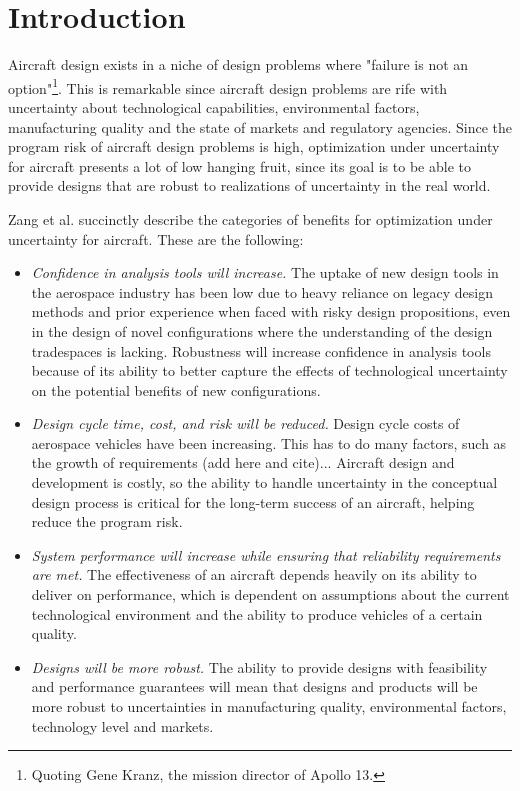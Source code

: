 \section{Introduction}

Aircraft design exists in a niche of design problems where "failure is
not an option"\footnote{Quoting Gene Kranz, the mission director of Apollo 13.}.
This is remarkable since aircraft design problems are rife with uncertainty about
technological capabilities, environmental factors, manufacturing quality and the
state of markets and regulatory agencies. Since the program risk of aircraft design
problems is high, optimization under uncertainty for aircraft presents a lot of
low hanging fruit, since its goal is to be able to provide designs that are robust
to realizations of uncertainty in the real world.

Zang et al.\cite{Zang2002} succinctly describe the categories of benefits for optimization under uncertainty for aircraft.
These are the following:
\begin{itemize}
    \item \textit{Confidence in analysis tools will increase.}
    The uptake of new design tools in the aerospace industry has been low
    due to heavy reliance on legacy design methods and prior experience when
    faced with risky design propositions,
    even in the design of novel configurations where the understanding
    of the design tradespaces is lacking. Robustness will increase
    confidence in analysis tools because of its ability to better capture the
    effects of technological uncertainty on the potential benefits of new
    configurations.
    \item \textit{Design cycle time, cost, and risk will be reduced.}
    Design cycle costs of aerospace vehicles have been increasing. This has to do
    many factors, such as the growth of requirements (add here and cite)...
    Aircraft design and development is costly, so the ability to handle uncertainty in
    the conceptual design process is critical for the long-term success of an aircraft,
    helping reduce the program risk.
    \item \textit{System performance will increase while ensuring that reliability requirements
    are met. }
    The effectiveness of an aircraft depends heavily on its
    ability to deliver on performance, which is dependent on assumptions about the
    current technological environment and the ability to produce vehicles of a certain quality.
    \item \textit{Designs will be more robust.}
    The ability to provide designs with feasibility and performance guarantees will mean
    that designs and products will be more robust to uncertainties in manufacturing quality,
    environmental factors, technology level and markets.
\end{itemize}

